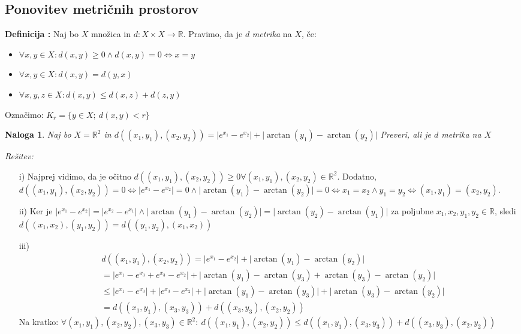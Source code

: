 \documentclass[a4paper, 10pt]{article}
\newtheorem{nal}{Naloga}
\newcounter{defcount}
\newenvironment{definicija}{\begin{flushleft}\stepcounter{defcount}\textbf{Definicija \arabic{defcount}:}}{\hfill\end{flushleft}}
\newenvironment{resitev}{\begin{flushleft}\textit{Rešitev:}}{\hfill\end{flushleft}}
\newcommand{\abs}[1]{\ensuremath{\lvert #1 \rvert}}
\newcommand{\mth}[1]{\ensuremath{\mathbb{#1}}}
\newcommand{\R}{\mth{R}}
\newcommand{\pojem}[1]{\emph{#1}}
\newcommand{\map}[3]{\ensuremath{{#1}: {#2} \rightarrow {#3}}}
\begin{document}
	\subsection{Ponovitev metričnih prostorov}
	\begin{definicija}
		Naj bo $X$ množica in $\map{d}{X\times X}{\R}$. Pravimo, da je $d$ \pojem{metrika} na $X$, če: \begin{itemize}
			\item $\forall x, y \in X: d(x, y) \geq 0 \land d(x, y) = 0 \iff x = y$
			\item $\forall x, y \in X: d(x, y) = d(y, x)$
			\item $\forall x, y,z \in X: d(x, y) \leq d(x, z) + d(z, y)$
		\end{itemize} 
		Označimo: $K_r = \{y\in X;~ d(x, y) < r\}$
	\end{definicija}
	\begin{nal}
		Naj bo $X = \R^2$ in $d((x_1, y_1),(x_2, y_2)) = \abs{e^{x_1} - e^{x_2}} + \abs{\arctan(y_1) - \arctan(y_2)}$ Preveri, ali je $d$ metrika na $X$
	\end{nal}
	\begin{resitev}
		\begin{itemize}
			\item[i)] Najprej vidimo, da je očitno $d((x_1, y_1),(x_2, y_2)) \geq 0 \forall (x_1, y_1),(x_2, y_2)\in \R^2$. Dodatno, $d((x_1, y_1),(x_2, y_2)) = 0 \iff \abs{e^{x_1} - e^{x_2}} = 0 \land \abs{\arctan(y_1) - \arctan(y_2)} = 0 \iff x_1 = x_2 \land y_1 = y_2 \iff (x_1, y_1)=(x_2, y_2)$.
			\item[ii)] Ker je $\abs{e^{x_1} - e^{x_2}} = \abs{e^{x_2} - e^{x_1}} \land \abs{\arctan(y_1) - \arctan(y_2)} = \abs{\arctan(y_2) - \arctan(y_1)}$ za poljubne $x_1, x_2, y_1, y_2\in\R$, sledi $d((x_1, x_2), (y_1, y_2)) = d((y_1, y_2), (x_1, x_2))$
			\item[iii)] \begin{align*}
				&d((x_1, y_1),(x_2, y_2)) = \abs{e^{x_1} - e^{x_2}} + \abs{\arctan(y_1) - \arctan(y_2)} \\
				&= \abs{e^{x_1} - e^{x_3} + e^{x_3}- e^{x_2}} + \abs{\arctan(y_1) - \arctan(y_3) + \arctan(y_3) - \arctan(y_2)} \\
				&\leq \abs{e^{x_1} - e^{x_3}} + \abs{e^{x_3}- e^{x_2}} + \abs{\arctan(y_1) - \arctan(y_3)} + \abs{\arctan(y_3) - \arctan(y_2)} \\ 
				&= d((x_1, y_1),(x_3, y_3)) + d((x_3, y_3),(x_2, y_2))
				\end{align*}
				Na kratko: $\forall (x_1, y_1),(x_2, y_2),(x_3, y_3)\in\R^2:~d((x_1, y_1),(x_2, y_2)) \leq d((x_1, y_1),(x_3, y_3)) + d((x_3, y_3),(x_2, y_2))$
		\end{itemize}
	\end{resitev}
\end{document}

